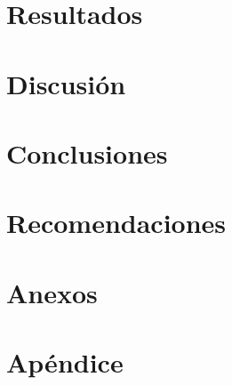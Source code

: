 \documentclass[11pt, letterpaper, twoside, openright]{report}
\newcommand{\defaultparformat}[1]{
	{\setlength{\parskip}{2ex}
     }
}
\begin{document}
% 	

\ifdefined\CAPresultados
	\newpage
	\chapter{Resultados}
	\ifdefined\parpordefecto
		\defaultparformat{m-resultados}
	\else
		
	\fi
\fi

\ifdefined\CAPdiscusion
	\newpage
	\chapter{Discusión}
	\ifdefined\parpordefecto
		\defaultparformat{n-discusion}
	\else
		
	\fi
\fi

\ifdefined\CAPconclusiones
	\newpage
	\chapter{Conclusiones}
	\ifdefined\parpordefecto
		\defaultparformat{o-conclusiones}
	\else
		
	\fi
\fi

\ifdefined\CAPrecomendaciones
	\newpage
	\chapter{Recomendaciones}
	\ifdefined\parpordefecto
		\defaultparformat{p-recomendaciones}
	\else
		
	\fi
\fi

\ifdefined\CAPbibliografia
	\newpage
	\cleardoublepage{}
	\chapter{\bibname}
	\printbibliography[heading=none]
\fi

\ifdefined\CAPanexos
	\newpage
	\chapter{Anexos}
	\ifdefined\parpordefecto
		\defaultparformat{r-anexos}
	\else
		
	\fi
\fi

\ifdefined\CAPapendice
	\newpage
	\chapter{Apéndice}
	\ifdefined\parpordefecto
		\defaultparformat{s-apendices}
	\else
		
	\fi
\fi
\end{document}
